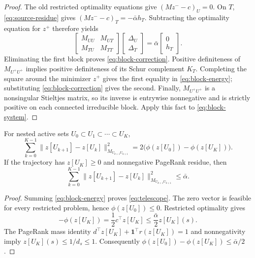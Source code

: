 \documentclass[11pt]{article}
\begin{document}
\begin{proof}
The old restricted optimality equations give
$(Mz^--c)_U=0$.  On $T$, \cref{eq:source-residue} gives
$(Mz^--c)_T=-\bar\alpha h_T$.  Subtracting the optimality equation for
$z^+$ therefore yields
\begin{equation}
 \begin{bmatrix}M_{UU}&M_{UT}\\M_{TU}&M_{TT}\end{bmatrix}
 \begin{bmatrix}\Delta_U\\\Delta_T\end{bmatrix}
 =\bar\alpha\begin{bmatrix}0\\h_T\end{bmatrix}.
 \label{eq:block-system}
\end{equation}
Eliminating the first block proves \cref{eq:block-correction}.  Positive
definiteness of $M_{U^+U^+}$ implies positive definiteness of its Schur
complement $K_T$.  Completing the square around the minimizer $z^+$ gives
the first equality in \cref{eq:block-energy}; substituting
\cref{eq:block-correction} gives the second.  Finally, $M_{U^+U^+}$ is a
nonsingular Stieltjes matrix, so its inverse is entrywise nonnegative and is
strictly positive on each connected irreducible block.  Apply this fact to
\cref{eq:block-system}.
\end{proof}

\begin{corollary}
\label{cor:energy-telescope}
For nested active sets $U_0\subset U_1\subset\cdots\subset U_K$,
\begin{equation}
 \sum_{k=0}^{K-1}
 \|z[U_{k+1}]-z[U_k]\|_{M_{U_{k+1}U_{k+1}}}^2
 =2\bigl(\phi(z[U_0])-\phi(z[U_K])\bigr).
 \label{eq:telescope}
\end{equation}
If the trajectory has $z[U_K]\geq0$ and nonnegative PageRank residue, then
\begin{equation}
 \sum_{k=0}^{K-1}
 \|z[U_{k+1}]-z[U_k]\|_{M_{U_{k+1}U_{k+1}}}^2
 \leq \bar\alpha.
 \label{eq:telescope-bound}
\end{equation}
\end{corollary}

\begin{proof}
Summing \cref{eq:block-energy} proves \cref{eq:telescope}.  The zero vector
is feasible for every restricted problem, hence
$\phi(z[U_0])\leq0$.  Restricted optimality gives
\begin{equation}
 -\phi(z[U_K])=\frac12c^\top z[U_K]
 \leq\frac{\bar\alpha}{2}z[U_K](s).
 \end{equation}
The PageRank mass identity
$d^\top z[U_K]+\mathbf 1^\top r(z[U_K])=1$ and nonnegativity imply
$z[U_K](s)\leq1/d_s\leq1$.  Consequently
$\phi(z[U_0])-\phi(z[U_K])\leq\bar\alpha/2$.
\end{proof}
\end{document}
